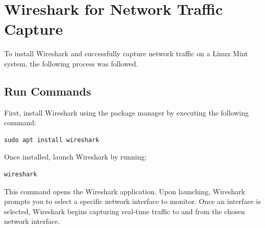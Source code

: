 


\section{Wireshark for Network Traffic Capture}
To install Wireshark and successfully capture network traffic on a Linux Mint system, the following process was followed.

\subsection{Run Commands}
First, install Wireshark using the package manager by executing the following command:

\begin{lstlisting}
sudo apt install wireshark
\end{lstlisting}

Once installed, launch Wireshark by running:

\begin{lstlisting}
wireshark
\end{lstlisting}

This command opens the Wireshark application. Upon launching, Wireshark prompts you to select a specific network interface to monitor. Once an interface is selected, Wireshark begins capturing real-time traffic to and from the chosen network interface.



